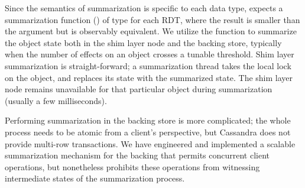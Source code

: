 Since the semantics of summarization is specific to each data type, \name
expects a summarization function () of type \cf{[e]->[e]} for
each RDT, where the result is smaller than the argument but is observably
equivalent. We utilize the  function to summarize the object
state both in the shim layer node and the backing store, typically when the
number of effects on an object crosses a tunable threshold. Shim layer
summarization is straight-forward; a summarization thread takes the local lock
on the object, and replaces its state with the summarized state. The shim layer
node remains unavailable for that particular object during summarization
(usually a few milliseconds).

Performing summarization in the backing store is more complicated; the whole
process needs to be atomic from a client's perspective, but Cassandra does not
provide multi-row transactions. We have engineered and implemented a scalable
summarization mechanism for the backing that permits concurrent client
operations, but nonetheless prohibits these operations from witnessing
intermediate states of the summarization process.
